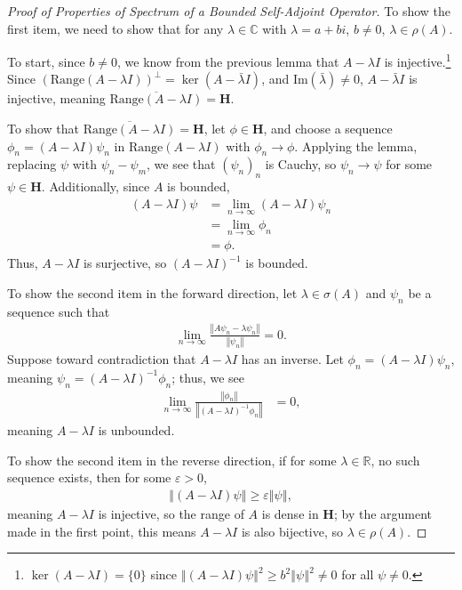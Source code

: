 \documentclass[12pt]{extarticle}
\newcommand{\R}{\mathbb{R}}
\newcommand{\C}{\mathbb{C}}
\newcommand{\norm}[1]{\left\Vert #1\right\Vert}
\theoremstyle{plain}
\theoremstyle{definition}
\theoremstyle{remark}
\renewcommand{\newline}{\hfill\break}
\begin{document}
  \begin{proof}[Proof of Properties of Spectrum of a Bounded Self-Adjoint Operator]
    To show the first item, we need to show that for any $\lambda \in \C$ with $\lambda = a + bi$, $b \neq 0$, $\lambda \in \rho(A)$.\newline

    To start, since $b\neq 0$, we know from the previous lemma that $A - \lambda I$ is injective.\footnote{$\ker(A - \lambda I) = \{0\}$ since $\norm{(A-\lambda I)\psi}^2 \geq b^2\norm{\psi}^2 \neq 0$ for all $\psi \neq 0$.} Since $\left(\text{Range}(A - \lambda I)\right)^{\perp} = \ker(A - \bar{\lambda}I)$, and $\text{Im}(\bar{\lambda}) \neq 0$, $A - \bar{\lambda} I$ is injective, meaning $\overline{\text{Range}(A - \lambda I)} = \mathbf{H}$.\newline

    To show that $\overline{\text{Range}(A - \lambda I)} = \mathbf{H}$, let $\phi \in \mathbf{H}$, and choose a sequence $\phi_n = (A - \lambda I)\psi_n$ in $\text{Range}(A - \lambda I)$ with $\phi_n \rightarrow \phi$. Applying the lemma, replacing $\psi$ with $\psi_n - \psi_m$, we see that $(\psi_n)_n$ is Cauchy, so $\psi_n \rightarrow \psi$ for some $\psi \in \mathbf{H}$. Additionally, since $A$ is bounded,
    \begin{align*}
      (A - \lambda I)\psi &= \lim_{n\rightarrow\infty}(A - \lambda I)\psi_n\\
                          &= \lim_{n\rightarrow\infty}\phi_n\\
                          &= \phi.
    \end{align*}
    Thus, $A - \lambda I$ is surjective, so $(A - \lambda I)^{-1}$ is bounded.\newline

    To show the second item in the forward direction, let $\lambda \in \sigma(A)$ and $\psi_n$ be a sequence such that
    \begin{align*}
      \lim_{n\rightarrow\infty}\frac{\norm{A\psi_n - \lambda \psi_n}}{\norm{\psi_n}} = 0.
    \end{align*}
    Suppose toward contradiction that $A - \lambda I$ has an inverse. Let $\phi_n = (A - \lambda I)\psi_n$, meaning $\psi_n = (A - \lambda I)^{-1}\phi_n$; thus, we see
    \begin{align*}
      \lim_{n\rightarrow\infty}\frac{\norm{\phi_n}}{\norm{(A - \lambda I)^{-1}\phi_n}} &= 0,
    \end{align*}
    meaning $A - \lambda I$ is unbounded.\newline

    To show the second item in the reverse direction, if for some $\lambda \in \R$, no such sequence exists, then for some $\varepsilon > 0$,
    \begin{align*}
      \norm{(A - \lambda I)\psi} \geq \varepsilon \norm{\psi},
    \end{align*}
    meaning $A - \lambda I$ is injective, so the range of $A$ is dense in $\mathbf{H}$; by the argument made in the first point, this means $A - \lambda I$ is also bijective, so $\lambda \in \rho(A)$.
  \end{proof}
\end{document}
